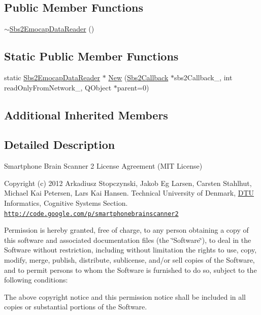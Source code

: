 \subsection*{Public Member Functions}
\begin{DoxyCompactItemize}
\item 
\hyperlink{classSbs2EmocapDataReader_a033e577741b84e7bee3be631e7358dda}{$\sim$\-Sbs2\-Emocap\-Data\-Reader} ()
\end{DoxyCompactItemize}
\subsection*{Static Public Member Functions}
\begin{DoxyCompactItemize}
\item 
static \hyperlink{classSbs2EmocapDataReader}{Sbs2\-Emocap\-Data\-Reader} $\ast$ \hyperlink{classSbs2EmocapDataReader_aa5717d7eda59221797a93d71d4086807}{New} (\hyperlink{classSbs2Callback}{Sbs2\-Callback} $\ast$sbs2\-Callback\-\_\-, int read\-Only\-From\-Network\-\_, Q\-Object $\ast$parent=0)
\end{DoxyCompactItemize}
\subsection*{Additional Inherited Members}


\subsection{Detailed Description}
Smartphone Brain Scanner 2 License Agreement (M\-I\-T License)

Copyright (c) 2012 Arkadiusz Stopczynski, Jakob Eg Larsen, Carsten Stahlhut, Michael Kai Petersen, Lars Kai Hansen. Technical University of Denmark, \hyperlink{namespaceDTU}{D\-T\-U} Informatics, Cognitive Systems Section. \href{http://code.google.com/p/smartphonebrainscanner2}{\tt http\-://code.\-google.\-com/p/smartphonebrainscanner2}

Permission is hereby granted, free of charge, to any person obtaining a copy of this software and associated documentation files (the \char`\"{}\-Software\char`\"{}), to deal in the Software without restriction, including without limitation the rights to use, copy, modify, merge, publish, distribute, sublicense, and/or sell copies of the Software, and to permit persons to whom the Software is furnished to do so, subject to the following conditions\-:

The above copyright notice and this permission notice shall be included in all copies or substantial portions of the Software.

